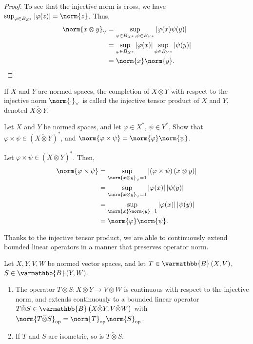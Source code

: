 \documentclass[10pt]{mypackage}
\renewcommand*{\mathbb}[1]{\varmathbb{#1}}
\newcommand{\B}{\mathbb{B}}
\begin{document}
\begin{proof}
  To see that the injective norm is cross, we have $\sup_{\varphi\in B_{Z^{\ast}}}\left\vert \varphi(z) \right\vert = \norm{z}$. Thus,
  \begin{align*}
    \norm{x\otimes y}_{\vee} &= \sup_{\varphi\in B_{X^{\ast}},\psi\in B_{Y^{\ast}}}\left\vert \varphi(x)\psi(y) \right\vert\\
                             &= \sup_{\varphi\in B_{X^{\ast}}}\left\vert \varphi(x) \right\vert  \sup_{\psi\in B_{Y^{\ast}}}\left\vert \psi(y) \right\vert\\
                             &= \norm{x}\norm{y}.
  \end{align*}
\end{proof}
\begin{definition}
  If $X$ and $Y$ are normed spaces, the completion of $X\otimes Y$ with respect to the injective norm $\norm{\cdot}_{\vee}$ is called the injective tensor product of $X$ and $Y$, denoted $X\check{\otimes}Y$.
\end{definition}
\begin{exercise}
  Let $X$ and $Y$ be normed spaces, and let $\varphi\in X^{\ast}$, $\psi\in Y^{\ast}$. Show that $\varphi\times \psi\in \left(X\check{\otimes}Y\right)^{\ast}$, and $\norm{\varphi\times\psi} = \norm{\varphi}\norm{\psi}$.
\end{exercise}
\begin{solution}
  Let $\varphi\times \psi\in \left(X\check\otimes Y\right)^{\ast}$. Then,
  \begin{align*}
    \norm{\varphi\times\psi} &= \sup_{\norm{x\otimes y}_{\vee} = 1}\left\vert \left(\varphi\times\psi\right)\left(x\otimes y\right) \right\vert\\
                             &= \sup_{\norm{x\otimes y}_{\vee} = 1}\left\vert \varphi(x) \right\vert\left\vert \psi(y) \right\vert\\
                             &= \sup_{\norm{x}\norm{y} = 1}\left\vert \varphi(x) \right\vert\left\vert \psi(y) \right\vert\\
                             &= \norm{\varphi}\norm{\psi}.
  \end{align*}
\end{solution}
Thanks to the injective tensor product, we are able to continuously extend bounded linear operators in a manner that preserves operator norm.
\begin{proposition}
  Let $X,Y,V,W$ be normed vector spaces, and let $T\in \B\left(X,V\right)$, $S\in \B\left(Y,W\right)$.
  \begin{enumerate}[(1)]
    \item The operator $T\otimes S: X\otimes Y \rightarrow V\otimes W$ is continuous with respect to the injective norm, and extends continuously to a bounded linear operator $T\check\otimes S\in \B\left(X\check\otimes Y,V\check\otimes W\right)$ with $\norm{T\check\otimes S}_{\text{op}} = \norm{T}_{\text{op}}\norm{S}_{\text{op}}$.
    \item If $T$ and $S$ are isometric, so is $T\check\otimes S$.
  \end{enumerate}
\end{proposition}
\end{document}
